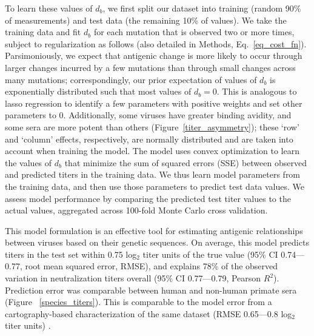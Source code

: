 \documentclass[11pt,oneside,letterpaper]{article}
\begin{document}
To learn these values of $d_b$, we first split our dataset into training (random 90\% of measurements) and test data (the remaining 10\% of values).
We take the training data and fit $d_b$ for each mutation that is observed two or more times, subject to regularization as follows (also detailed in Methods, Eq.~\ref{eq_cost_fn}).
Parsimoniously, we expect that antigenic change is more likely to occur through larger changes incurred by a few mutations than through small changes across many mutations; correspondingly, our prior expectation of values of $d_b$ is exponentially distributed such that most values of $d_b = 0$.
This is analogous to lasso regression to identify a few parameters with positive weights and set other parameters to 0.
Additionally, some viruses have greater binding avidity, and some sera are more potent than others (Figure~\ref{titer_asymmetry}); these `row' and `column' effects, respectively, are normally distributed and are taken into account when training the model.
The model uses convex optimization to learn the values of $d_b$ that minimize the sum of squared errors (SSE) between observed and predicted titers in the training data.
We thus learn model parameters from the training data, and then use those parameters to predict test data values.
We assess model performance by comparing the predicted test titer values to the actual values, aggregated across 100-fold Monte Carlo cross validation.

This model formulation is an effective tool for estimating antigenic relationships between viruses based on their genetic sequences.
On average, this model predicts titers in the test set within 0.75 log$_2$ titer units of the true value (95\% CI 0.74---0.77, root mean squared error, RMSE), and explains 78\% of the observed variation in neutralization titers overall (95\% CI 0.77---0.79, Pearson $R^2$).
Prediction error was comparable between human and non-human primate sera (Figure ~\ref{species_titers}).
This is comparable to the model error from a cartography-based characterization of the same dataset (RMSE 0.65---0.8 log$_2$ titer units) \citep{katzelnick2015dengue}.
\end{document}
